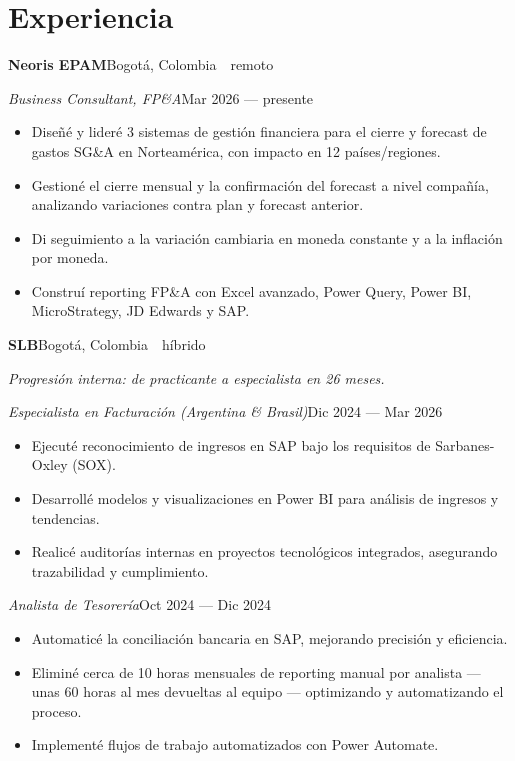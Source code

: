 \documentclass[a4paper,10pt]{article}
\newcommand{\headline}[2]{\needspace{3\baselineskip}\textbf{\color{ink}#1}\hfill{\small #2}\par}
\newcommand{\subline}[2]{\textit{#1}\hfill{\small #2}\par}
\begin{document}
\section*{Experiencia}
\headline{Neoris EPAM}{Bogotá, Colombia \,\textperiodcentered\, remoto}
\vspace{1pt}
\subline{Business Consultant, FP\&A}{Mar 2026 --- presente}
\begin{itemize}[leftmargin=1.1em, itemsep=0pt, topsep=1pt, parsep=0pt]
  \item Diseñé y lideré 3 sistemas de gestión financiera para el cierre y forecast de gastos SG\&A en Norteamérica, con impacto en 12 países/regiones.
  \item Gestioné el cierre mensual y la confirmación del forecast a nivel compañía, analizando variaciones contra plan y forecast anterior.
  \item Di seguimiento a la variación cambiaria en moneda constante y a la inflación por moneda.
  \item Construí reporting FP\&A con Excel avanzado, Power Query, Power BI, MicroStrategy, JD Edwards y SAP.
\end{itemize}
\vspace{4pt}
\headline{SLB}{Bogotá, Colombia \,\textperiodcentered\, híbrido}
{\small\itshape\color{cold} Progresión interna: de practicante a especialista en 26 meses.}\par
\vspace{1pt}
\subline{Especialista en Facturación (Argentina \& Brasil)}{Dic 2024 --- Mar 2026}
\begin{itemize}[leftmargin=1.1em, itemsep=0pt, topsep=1pt, parsep=0pt]
  \item Ejecuté reconocimiento de ingresos en SAP bajo los requisitos de Sarbanes-Oxley (SOX).
  \item Desarrollé modelos y visualizaciones en Power BI para análisis de ingresos y tendencias.
  \item Realicé auditorías internas en proyectos tecnológicos integrados, asegurando trazabilidad y cumplimiento.
\end{itemize}
\subline{Analista de Tesorería}{Oct 2024 --- Dic 2024}
\begin{itemize}[leftmargin=1.1em, itemsep=0pt, topsep=1pt, parsep=0pt]
  \item Automaticé la conciliación bancaria en SAP, mejorando precisión y eficiencia.
  \item Eliminé cerca de 10 horas mensuales de reporting manual por analista --- unas 60 horas al mes devueltas al equipo --- optimizando y automatizando el proceso.
  \item Implementé flujos de trabajo automatizados con Power Automate.
\end{itemize}
\end{document}
